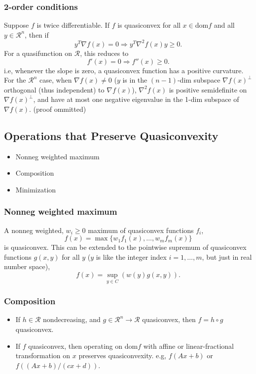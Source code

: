 \subsubsection{2-order conditions}
Suppose $f$ is twice differentiable.
If $f$ is quasiconvex for all $x \in $dom$f$ and all $y \in \mathcal{R}^n$, then if
\begin{equation}
   y^T \nabla f(x)= 0 \Rightarrow y^T \nabla^2 f(x) y \ge 0.
\end{equation}
For a quasifunction on $\mathcal{R}$, this reduces to 
\begin{equation*}
   f'(x)= 0 \Rightarrow f''(x) \ge 0.
\end{equation*}
i.e, whenever the slope is zero, a quasiconvex function has a positive curvature.
For the $\mathcal{R}^n$ case, when $\nabla f(x) \neq 0$ ($y$ is in the $(n-1)$-dim subspace $\nabla f(x)^\perp$ orthogonal (thus independent) to $\nabla f(x)$), $\nabla^2 f(x)$ is positive semidefinite on $\nabla f(x)^\perp$, and have at most one negative eigenvalue in the 1-dim subspace of $\nabla f(x)$.
(proof ommitted)

\subsection{Operations that Preserve Quasiconvexity}
\begin{itemize}
   \item Nonneg weighted maximum
   \item Composition
   \item Minimization
\end{itemize}

\subsubsection{Nonneg weighted maximum}
A nonneg weighted, $w_i \ge 0$ maximum of quasiconvex functions $f_i$,
\begin{equation}
   f(x)= \max\{ w_1f_1(x), \dotsc, w_mf_m(x) \}
\end{equation}
is quasiconvex.
This can be extended to the pointwise supremum of quasiconvex functions $g(x,y)$ for all $y$ ($y$ is like the integer index $i=1,\dotsc,m$, but just in real number space),
\begin{equation}
   f(x)= \sup_{y \in C}\left(w(y)g(x,y)\right).
\end{equation}

\subsubsection{Composition}
\begin{itemize}
   \item If $h \in \mathcal{R}$ nondecreasing, and $g \in \mathcal{R}^n \rightarrow \mathcal{R}$ quasiconvex, then $f= h \circ g$ quasiconvex.
   \item If $f$ quasiconvex, then operating on dom$f$ with affine or linear-fractional transformation on $x$ preserves quasiconvexity. e.g, $f(Ax+b)$ or $f((Ax+b)/(cx+d))$.
\end{itemize}

